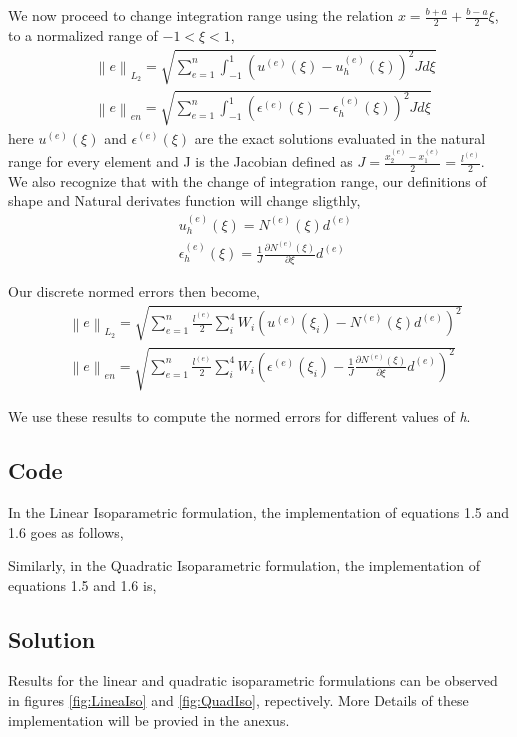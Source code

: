 \documentclass[a4paper]{memoir}
\begin{document}
We now proceed to change integration range using the relation $x=\frac{b+a}{2}+\frac{b-a}{2}\xi$, to a normalized range of $-1<\xi<1$,
\begin{align*}
	& \left\|e \right\|_{L_2} = \sqrt{\sum_{e=1}^{n} \int_{-1}^{1}\left(u^{(e)}(\xi)-u_h^{(e)}(\xi)\right)^2 J d\xi} \\
	& \left\|e \right\|_{en} = \sqrt{\sum_{e=1}^{n} \int_{-1}^{1}\left(\epsilon^{(e)}(\xi)-\epsilon_h^{(e)}(\xi)\right)^2 J d\xi}
\end{align*}
here $u^{(e)}(\xi)$ and $\epsilon^{(e)}(\xi)$ are the exact solutions evaluated in the natural range for every element and J is the Jacobian defined as $J = \frac{x_2^{(e)}-x_1^{(e)}}{2} = \frac{l^{(e)}}{2}$. \\

We also recognize that with the change of integration range, our definitions of shape and Natural derivates function will change sligthly,
\begin{align*}
	& u_h^{(e)}(\xi) =  N^{(e)}(\xi) d^{(e)}\\
	& \epsilon_h^{(e)}(\xi) = \frac{1}{J} \frac{\partial N^{(e)}(\xi)}{\partial \xi} d^{(e)}
\end{align*}

Our discrete normed errors then become,
\begin{align}
	& \left\|e \right\|_{L_2} = \sqrt{\sum_{e=1}^{n} \frac{l^{(e)}}{2}\sum_i^4 W_i\left(u^{(e)}(\xi_i)-N^{(e)}(\xi) d^{(e)}\right)^2 } \\
	& \left\|e \right\|_{en} = \sqrt{\sum_{e=1}^{n} \frac{l^{(e)}}{2}\sum_i^4 W_i\left(\epsilon^{(e)}(\xi_i)-\frac{1}{J} \frac{\partial N^{(e)}(\xi)}{\partial \xi} d^{(e)}\right)^2 }
\end{align}

We use these results to compute the normed errors for different values of \textit{h}.

\subsection{Code}
In the Linear Isoparametric formulation, the implementation of equations 1.5 and 1.6 goes as follows,


Similarly, in the Quadratic Isoparametric formulation, the implementation of equations 1.5 and 1.6 is,


\subsection{Solution}
Results for the linear and quadratic isoparametric formulations can be observed in figures \ref{fig:LineaIso} and \ref{fig:QuadIso}, repectively. More Details of these implementation will be provied in the anexus. \\
\end{document}
